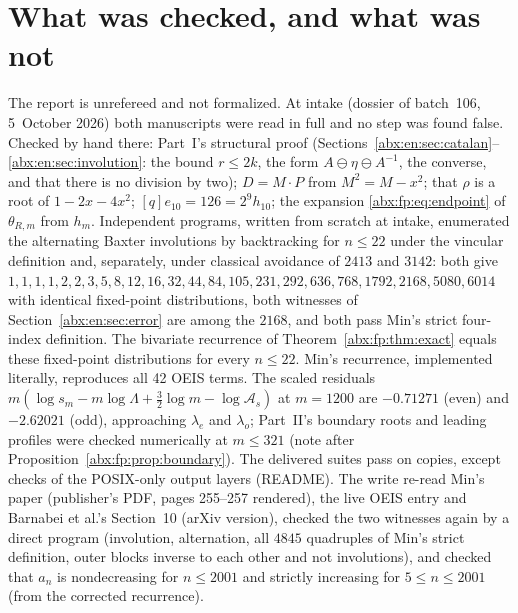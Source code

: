 \documentclass[11pt,letterpaper]{article}
\numberwithin{equation}{section}
\theoremstyle{remark}\newtheorem{remark}[theorem]{Remark}
\begin{document}
\section*{What was checked, and what was not}\label{abx:sec:trust}
The report is unrefereed and not formalized. At intake (dossier of batch~106, 5~October 2026) both manuscripts were read in full and no step was found false. Checked by hand there: Part~I's structural proof (Sections~\ref{abx:en:sec:catalan}--\ref{abx:en:sec:involution}: the bound $r\le2k$, the form $A\ominus\eta\ominus A^{-1}$, the converse, and that there is no division by two); $D=M\cdot P$ from $M^2=M-x^2$; that $\rho$ is a root of $1-2x-4x^2$; $[q]e_{10}=126=2^9h_{10}$; the expansion \eqref{abx:fp:eq:endpoint} of $\theta_{R,m}$ from $h_m$. Independent programs, written from scratch at intake, enumerated the alternating Baxter involutions by backtracking for $n\le22$ under the vincular definition and, separately, under classical avoidance of $2413$ and $3142$: both give $1,\allowbreak 1,\allowbreak 1,\allowbreak 1,\allowbreak 2,\allowbreak 2,\allowbreak 3,\allowbreak 5,\allowbreak 8,\allowbreak 12,\allowbreak 16,\allowbreak 32,\allowbreak 44,\allowbreak 84,\allowbreak 105,\allowbreak 231,\allowbreak 292,\allowbreak 636,\allowbreak 768,\allowbreak 1792,\allowbreak 2168,\allowbreak 5080,\allowbreak 6014$ with identical fixed-point distributions, both witnesses of Section~\ref{abx:en:sec:error} are among the $2168$, and both pass Min's strict four-index definition. The bivariate recurrence of Theorem~\ref{abx:fp:thm:exact} equals these fixed-point distributions for every $n\le22$. Min's recurrence, implemented literally, reproduces all 42 OEIS terms. The scaled residuals $m(\log s_m-m\log\Lambda+\frac32\log m-\log\mathcal A_s)$ at $m=1200$ are $-0.71271$ (even) and $-2.62021$ (odd), approaching $\lambda_e$ and $\lambda_o$; Part~II's boundary roots and leading profiles were checked numerically at $m\le321$ (note after Proposition~\ref{abx:fp:prop:boundary}). The delivered suites pass on copies, except checks of the POSIX-only output layers (README). The write re-read Min's paper (publisher's PDF, pages 255--257 rendered), the live OEIS entry and Barnabei et al.'s Section~10 (arXiv version), checked the two witnesses again by a direct program (involution, alternation, all $4845$ quadruples of Min's strict definition, outer blocks inverse to each other and not involutions), and checked that $a_n$ is nondecreasing for $n\le2001$ and strictly increasing for $5\le n\le2001$ (from the corrected recurrence).
\end{document}
